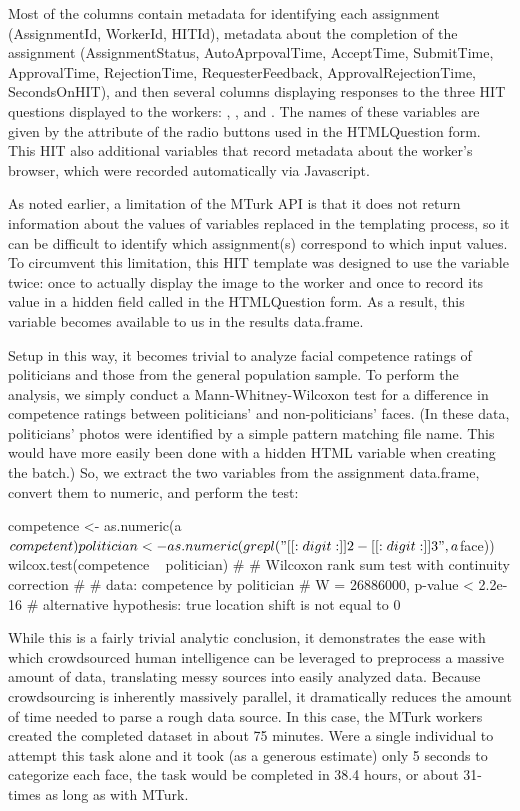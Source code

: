 \noindent Most of the columns contain metadata for identifying each assignment (AssignmentId, WorkerId, HITId), metadata about the completion of the assignment (AssignmentStatus, AutoAprpovalTime, AcceptTime, SubmitTime, ApprovalTime, RejectionTime, RequesterFeedback, ApprovalRejectionTime, SecondsOnHIT), and then several columns displaying responses to the three HIT questions displayed to the workers: , , and . The names of these variables are given by the  attribute of the radio buttons used in the HTMLQuestion form. This HIT also additional variables that record metadata about the worker's browser, which were recorded automatically via Javascript.

As noted earlier, a limitation of the MTurk API is that it does not return information about the values of variables replaced in the templating process, so it can be difficult to identify which assignment(s) correspond to which input values. To circumvent this limitation, this HIT template was designed to use the  variable twice: once to actually display the image to the worker and once to record its value in a hidden field called  in the HTMLQuestion form. As a result, this variable becomes available to us in the results data.frame.

Setup in this way, it becomes trivial to analyze facial competence ratings of politicians and those from the general population sample. To perform the analysis, we simply conduct a Mann-Whitney-Wilcoxon test for a difference in competence ratings between politicians' and non-politicians' faces. (In these data, politicians' photos were identified by a simple pattern matching file name. This would have more easily been done with a hidden HTML variable when creating the batch.) So, we extract the two variables from the assignment data.frame, convert them to numeric, and perform the test:

\begin{example}
competence <- as.numeric(a$competent)
politician <- as.numeric(grepl("[[:digit:]]{2}-[[:digit:]]{3}", a$face))
wilcox.test(competence ~ politician)
# 
#         Wilcoxon rank sum test with continuity correction
# 
# data:  competence by politician
# W = 26886000, p-value < 2.2e-16
# alternative hypothesis: true location shift is not equal to 0
\end{example}

While this is a fairly trivial analytic conclusion, it demonstrates the ease with which crowdsourced human intelligence can be leveraged to preprocess a massive amount of data, translating messy sources into easily analyzed data. Because crowdsourcing is inherently massively parallel, it dramatically reduces the amount of time needed to parse a rough data source. In this case, the MTurk workers created the completed dataset in about 75 minutes. Were a single individual to attempt this task alone and it took (as a generous estimate) only 5 seconds to categorize each face, the task would be completed in 38.4 hours, or about 31-times as long as with MTurk.

